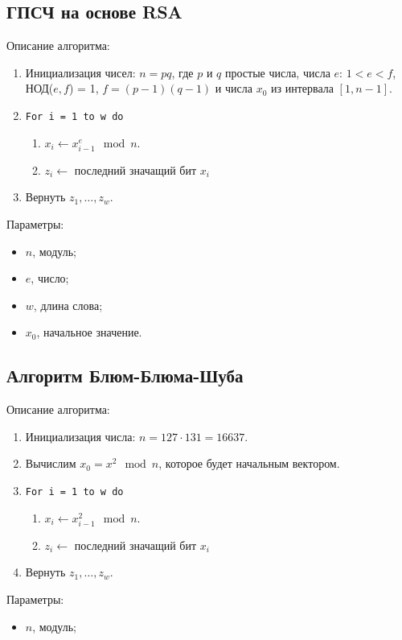 \documentclass[bachelor, och, labwork]{SCWorks}
\begin{document}
\subsection{ГПСЧ на основе RSA}
Описание алгоритма:
\begin{enumerate}
  \item Инициализация чисел: $n = pq$, где $p$ и $q$ простые числа, числа $e$: $1 < e < f$, НОД($e, f$) = 1, $f = (p - 1)(q - 1)$ и числа $x_0$ из интервала $[1, n - 1]$.
  \item \texttt{For i = 1 to w do}
        \begin{enumerate}
          \item $x_i \leftarrow x_{i-1}^e \mod n$.
          \item $z_i \leftarrow $ последний значащий бит $x_i$
        \end{enumerate}
  \item Вернуть $z_1, \dots, z_w$.
\end{enumerate}

Параметры:
\begin{itemize}
  \item $n$, модуль;
  \item $e$, число;
  \item $w$, длина слова;
  \item $x_0$, начальное значение.
\end{itemize}

\subsection{Алгоритм Блюм-Блюма-Шуба}
Описание алгоритма:
\begin{enumerate}
  \item Инициализация числа: $n = 127 \cdot 131 = 16637$.
  \item Вычислим $x_0 = x^2 \mod n$, которое будет начальным вектором.
  \item \texttt{For i = 1 to w do}
        \begin{enumerate}
          \item $x_i \leftarrow x_{i-1}^2 \mod n$.
          \item $z_i \leftarrow $ последний значащий бит $x_i$
        \end{enumerate}
  \item Вернуть $z_1, \dots, z_w$.
\end{enumerate}

Параметры:
\begin{itemize}
  \item $n$, модуль;
\end{itemize}
\end{document}
